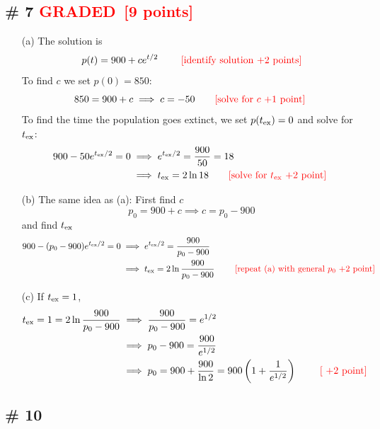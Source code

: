 \documentclass[12pt,letterpaper]{exam}
\newcommand{\grade}{\textcolor{red}{GRADED}}
\newcommand{\pts}[1]{\textcolor{red}{[#1]}}
\begin{document}
\subsection*{\# 7 \grade \, \pts{9 points}}
\begin{enumerate}
\item[(a)] The solution is 
\begin{equation}
p(t) = 900 + ce^{t/2} \quad\quad \text{ \pts{identify solution +2 points}}
\end{equation}
To find $c$ we set $p(0) = 850$: 
\begin{equation}
850 = 900 + c \implies c = -50 \quad\quad \text{\pts{solve for $c$ +1 point} }
\end{equation}
To find the time the population goes extinct, we set $p(t_{\rm ex}) = 0$ and solve for $t_{\rm ex}$: 
\begin{align}
900 -50 e^{t_{\rm ex}/2} =0 &\implies e^{t_{\rm ex}/2}  = \frac{900}{50} =18\\
&\implies t_{\rm ex} = 2 \ln18  \quad\quad \text{\pts{solve for $t_{\rm ex}$ +2 point} }
\end{align}
\item[(b)] The same idea as (a): First find $c$
\begin{equation}
p_0 = 900 + c \implies c = p_0-900
\end{equation}
and find $t_{\rm ex}$
\begin{align}
900 -(p_0-900) e^{t_{\rm ex}/2} =0 &\implies e^{t_{\rm ex}/2}  = \frac{900}{p_0-900}\\
&\implies t_{\rm ex} = 2 \ln\frac{900}{p_0-900} \quad\quad \text{ \pts{repeat (a) with general $p_0$  +2 point} }
\end{align}
\item[(c)]  If $t_{\rm ex} = 1$, 
\begin{align}
t_{\rm ex}  =1= 2 \ln\frac{900}{p_0-900}&\implies  \frac{900}{p_0-900} =e^{1/2}\\
&\implies p_0-900 = \frac{900}{e^{1/2}} \\
&\implies p_0 =   900 + \frac{900}{\ln 2} = 900\left(1+ \frac{1}{e^{1/2}} \right) \quad \text{ \quad \text{\pts{ +2 point}}}
\end{align}

\end{enumerate}


\subsection*{\# 10 }
\end{document}
